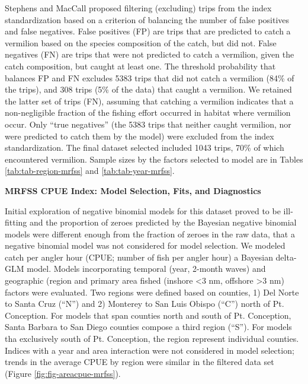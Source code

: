 \documentclass[
  english,
  a4paper,
]{article}
\begin{document}
Stephens and MacCall proposed filtering (excluding) trips from the index
standardization based on a criterion of balancing the number of false positives
and false negatives. False positives (FP) are trips that are predicted to catch
a vermilion based on the species composition of the catch, but did not. False
negatives (FN) are trips that were not predicted to catch a vermilion, given the
catch composition, but caught at least one. The threshold probability that
balances FP and FN excludes
5383
trips that did not catch a vermilion (84\%
of the trips), and 308
trips (5\% of the data) that
caught a vermilion. We retained the latter set of trips (FN), assuming that
catching a vermilion indicates that a non-negligible fraction of the fishing
effort occurred in habitat where vermilion occur. Only ``true negatives''
(the 5383
trips that neither caught vermilion, nor were predicted to catch them by the model)
were excluded from the index standardization. The final dataset selected included
1043 trips, 70\%
of which encountered vermilion. Sample sizes by the factors selected to model are in Tables
\ref{tab:tab-region-mrfss} and \ref{tab:tab-year-mrfss}.

\textbf{MRFSS CPUE Index: Model Selection, Fits, and Diagnostics}

Initial exploration of negative binomial models for this dataset proved to be
ill-fitting and the proportion of zeroes predicted by the Bayesian negative binomial
models were different enough from the fraction of zeroes in the raw data, that
a negative binomial model was not considered for model selection. We modeled catch
per angler hour (CPUE; number of fish per angler hour) a Bayesian delta-GLM model.
Models incorporating temporal (year, 2-month waves)
and geographic (region and primary area fished (inshore \textless3 nm, offshore \textgreater3 nm)
factors were evaluated. Two regions were defined based on counties, 1) Del Norte
to Santa Cruz (``N'') and 2) Monterey to San Luis Obispo (``C'') north of Pt. Conception.
For models that span counties north and south of Pt. Conception, Santa Barbara to
San Diego counties compose a third region (``S''). For models tha exclusively south
of Pt. Conception, the region represent individual counties. Indices with a year
and area interaction were not considered in model selection; trends in the average
CPUE by region were similar in the filtered data set (Figure \ref{fig:fig-areacpue-mrfss}).
\end{document}
